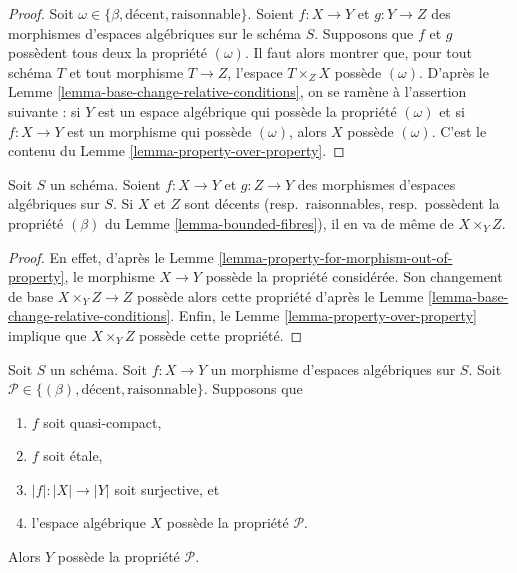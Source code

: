 \begin{proof}
Soit $\omega \in \{\beta, \text{décent}, \text{raisonnable}\}$.
Soient $f : X \to Y$ et $g : Y \to Z$ des morphismes d'espaces algébriques
sur le schéma $S$. Supposons que $f$ et $g$ possèdent tous deux la propriété
$(\omega)$. Il faut alors montrer que, pour tout schéma $T$ et tout morphisme
$T \to Z$, l'espace $T \times_Z X$ possède $(\omega)$. D'après le
Lemme \ref{lemma-base-change-relative-conditions},
on se ramène à l'assertion suivante : si $Y$ est un espace algébrique qui
possède la propriété $(\omega)$ et si $f : X \to Y$ est un morphisme qui
possède $(\omega)$, alors $X$ possède $(\omega)$.
C'est le contenu du Lemme \ref{lemma-property-over-property}.
\end{proof}

\begin{lemma}
\label{lemma-fibre-product-conditions}
Soit $S$ un schéma. Soient $f : X \to Y$ et $g : Z \to Y$ des morphismes
d'espaces algébriques sur $S$. Si $X$ et $Z$ sont décents
(resp.\ raisonnables, resp.\ possèdent la propriété
$(\beta)$ du Lemme \ref{lemma-bounded-fibres}), il en va de même de
$X \times_Y Z$.
\end{lemma}

\begin{proof}
En effet, d'après le Lemme \ref{lemma-property-for-morphism-out-of-property},
le morphisme $X \to Y$ possède la propriété considérée. Son changement de
base $X \times_Y Z \to Z$ possède alors cette propriété d'après le
Lemme \ref{lemma-base-change-relative-conditions}.
Enfin, le Lemme \ref{lemma-property-over-property} implique que
$X \times_Y Z$ possède cette propriété.
\end{proof}

\begin{lemma}
\label{lemma-descent-conditions}
Soit $S$ un schéma.
Soit $f : X \to Y$ un morphisme d'espaces algébriques sur $S$.
Soit $\mathcal{P} \in \{(\beta), \text{décent}, \text{raisonnable}\}$.
Supposons que
\begin{enumerate}
\item $f$ soit quasi-compact,
\item $f$ soit étale,
\item $|f| : |X| \to |Y|$ soit surjective, et
\item l'espace algébrique $X$ possède la propriété $\mathcal{P}$.
\end{enumerate}
Alors $Y$ possède la propriété $\mathcal{P}$.
\end{lemma}

